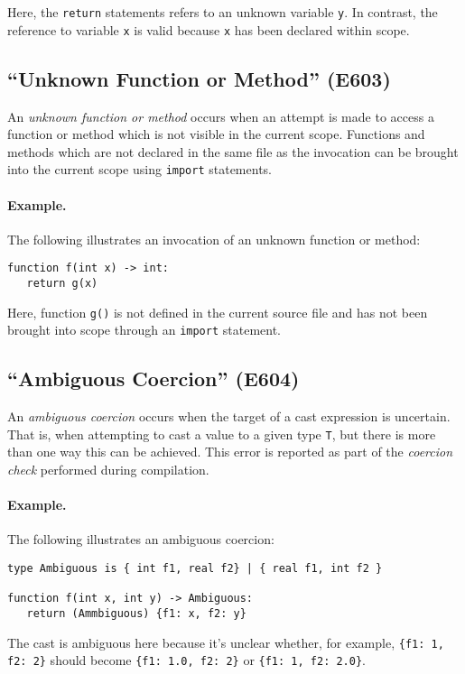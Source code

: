 Here, the \lstinline{return} statements refers to an unknown variable \lstinline{y}.  In contrast, the reference to variable \lstinline{x} is valid because \lstinline{x} has been declared within scope.

\subsection{``Unknown Function or Method'' (E603)}

An {\em unknown function or method} occurs when an attempt is made to access a function or method which is not visible in the current scope.  Functions and methods which are not declared in the same file as the invocation can be brought into the current scope using \lstinline{import} statements.  
\paragraph{Example.}  The following illustrates an invocation of an unknown function or method:

\begin{lstlisting}
function f(int x) -> int:
   return g(x)
\end{lstlisting}

Here, function \lstinline{g()} is not defined in the current source file and has not been brought into scope through an \lstinline{import} statement.

\subsection{``Ambiguous Coercion'' (E604)}

An {\em ambiguous coercion} occurs when the target of a cast expression is uncertain.  That is, when attempting to cast a value to a given type \lstinline{T}, but there is more than one way this can be achieved.  This error is reported as part of the {\em coercion check} performed during compilation.

\paragraph{Example.}  The following illustrates an ambiguous coercion:

\begin{lstlisting}
type Ambiguous is { int f1, real f2} | { real f1, int f2 }

function f(int x, int y) -> Ambiguous:
   return (Ammbiguous) {f1: x, f2: y}
\end{lstlisting}

The cast is ambiguous here because it's unclear whether, for example, \lstinline|{f1: 1, f2: 2}| should become \lstinline|{f1: 1.0, f2: 2}| or \lstinline|{f1: 1, f2: 2.0}|.

